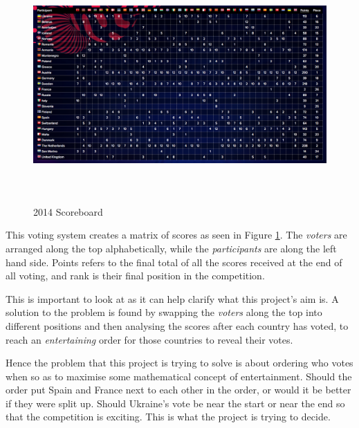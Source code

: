 \documentclass[12pt]{report}
\begin{document}
\begin{figure}[H]
\centering
\includegraphics[width=16cm, height=9cm]{./2014Scoreboard}
\caption{2014 Scoreboard}
\label{f_2014Scores}
\end{figure}

This voting system creates a matrix of scores as seen in Figure \ref{f_2014Scores}\cite{EurovisionScoreboard}. The \textit{voters} are arranged along the top alphabetically, while the \textit{participants} are along the left hand side. Points refers to the final total of all the scores received at the end of all voting, and rank is their final position in the competition. 

This is important to look at as it can help clarify what this project's aim is. A solution to the problem is found by swapping the \textit{voters} along the top into different positions and then analysing the scores after each country has voted, to reach an \textit{entertaining} order for those countries to reveal their votes.

Hence the problem that this project is trying to solve is about ordering who votes when so as to maximise some mathematical concept of entertainment. Should the order put Spain and France next to each other in the order, or would it be better if they were split up. Should Ukraine's vote be near the start or near the end so that the competition is exciting. This is what the project is trying to decide.
\end{document}
